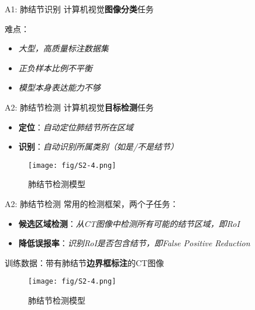\documentclass[10pt]{beamer}
\begin{document}
\begin{frame}{A1: 肺结节识别}
  计算机视觉\textbf{图像分类}任务
  \vspace{5 mm}

  难点：
  \begin{itemize}
    \item \textit{大型，高质量标注数据集}
    \item \textit{正负样本比例不平衡}
    \item \textit{模型本身表达能力不够}
  \end{itemize}
\end{frame}

\begin{frame}{A2: 肺结节检测}
  计算机视觉\textbf{目标检测}任务
  \begin{itemize}
    \item \textbf{定位}：\textit{自动定位肺结节所在区域}
    \item \textbf{识别}：\textit{自动识别所属类别（如是/不是结节）}
  \end{itemize}

  \begin{figure}[htbp]
      \centering
      \texttt{[image: fig/S2-4.png]}
      \caption{肺结节检测模型}
  \end{figure}
\end{frame}

\begin{frame}{A2: 肺结节检测}
  常用的检测框架，两个子任务：
  \begin{itemize}
    \item \textbf{候选区域检测}：\textit{从CT图像中检测所有可能的结节区域，即RoI}
    \item \textbf{降低误报率}：\textit{识别RoI是否包含结节，即False Positive Reduction}
  \end{itemize}

  训练数据：带有肺结节\textbf{边界框标注}的CT图像

  \begin{figure}[htbp]
      \centering
      \texttt{[image: fig/S2-4.png]}
      \caption{肺结节检测模型}
  \end{figure}
\end{frame}
\end{document}
